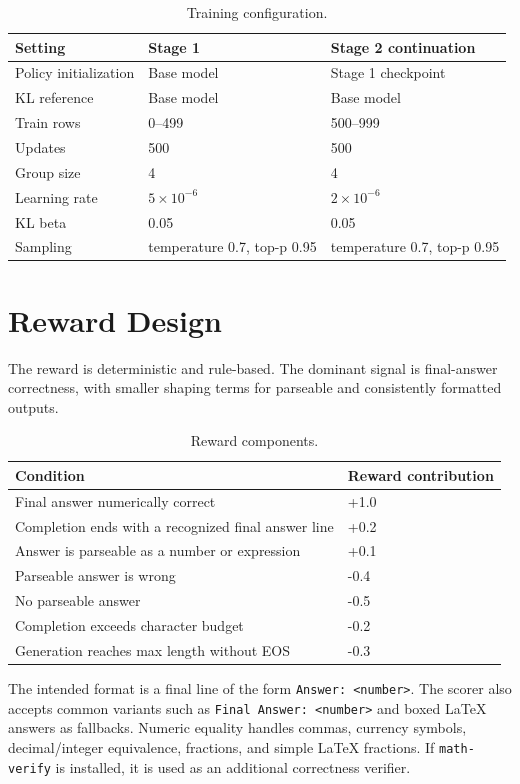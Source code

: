 \documentclass[11pt]{article}
\begin{document}
\begin{table}[h]
\centering
\caption{Training configuration.}
\begin{tabular}{lll}
\toprule
Setting & Stage 1 & Stage 2 continuation \\
\midrule
Policy initialization & Base model & Stage 1 checkpoint \\
KL reference & Base model & Base model \\
Train rows & 0--499 & 500--999 \\
Updates & 500 & 500 \\
Group size & 4 & 4 \\
Learning rate & \(5\times 10^{-6}\) & \(2\times 10^{-6}\) \\
KL beta & 0.05 & 0.05 \\
Sampling & temperature 0.7, top-p 0.95 & temperature 0.7, top-p 0.95 \\
\bottomrule
\end{tabular}
\end{table}

\section{Reward Design}

The reward is deterministic and rule-based. The dominant signal is final-answer correctness, with smaller shaping terms for parseable and consistently formatted outputs.

\begin{table}[h]
\centering
\caption{Reward components.}
\begin{tabular}{ll}
\toprule
Condition & Reward contribution \\
\midrule
Final answer numerically correct & +1.0 \\
Completion ends with a recognized final answer line & +0.2 \\
Answer is parseable as a number or expression & +0.1 \\
Parseable answer is wrong & -0.4 \\
No parseable answer & -0.5 \\
Completion exceeds character budget & -0.2 \\
Generation reaches max length without EOS & -0.3 \\
\bottomrule
\end{tabular}
\end{table}

The intended format is a final line of the form \texttt{Answer: <number>}. The scorer also accepts common variants such as \texttt{Final Answer: <number>} and boxed LaTeX answers as fallbacks. Numeric equality handles commas, currency symbols, decimal/integer equivalence, fractions, and simple LaTeX fractions. If \texttt{math-verify} is installed, it is used as an additional correctness verifier.
\end{document}
